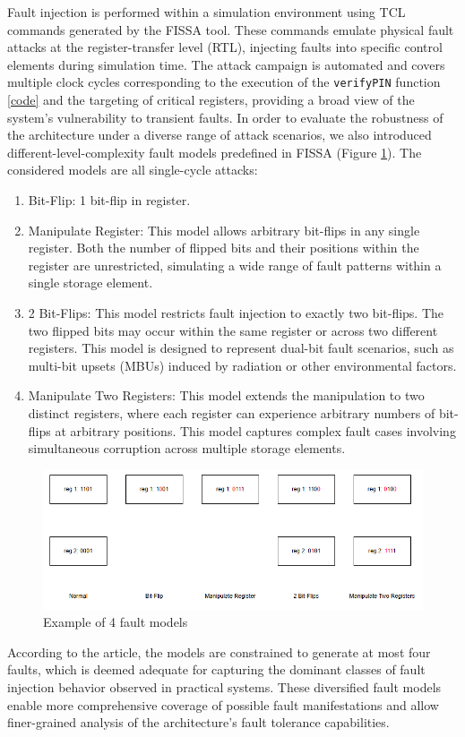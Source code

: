 Fault injection is performed within a simulation environment using TCL commands generated by the FISSA tool. These commands emulate physical fault attacks at the register-transfer level (RTL), injecting faults into specific control elements during simulation time. The attack campaign is automated and covers multiple clock cycles corresponding to the execution of the \texttt{verifyPIN} function \ref{code} and the targeting of critical registers, providing a broad view of the system’s vulnerability to transient faults. In order to evaluate the robustness of the architecture under a diverse range of attack scenarios, we also introduced different-level-complexity fault models predefined in FISSA (Figure \ref{fault model}). The considered models are all single-cycle attacks:
\begin{enumerate}
\item Bit-Flip: 1 bit-flip in register.
\item Manipulate Register: This model allows arbitrary bit-flips in any single register. Both the number of flipped bits and their positions within the register are unrestricted, simulating a wide range of fault patterns within a single storage element.
\item 2 Bit-Flips: This model restricts fault injection to exactly two bit-flips. The two flipped bits may occur within the same register or across two different registers. This model is designed to represent dual-bit fault scenarios, such as multi-bit upsets (MBUs) induced by radiation or other environmental factors.
\item Manipulate Two Registers: This model extends the manipulation to two distinct registers, where each register can experience arbitrary numbers of bit-flips at arbitrary positions. This model captures complex fault cases involving simultaneous corruption across multiple storage elements.
\end{enumerate}

\begin{figure}[t!]
  \centering
  \includegraphics[width=0.5\linewidth]{Chapitre2/figures/fault model.png}
  \caption{Example of 4 fault models}
  \label{fault model}
\end{figure}

According to the article\cite{sass2023oops}, the models are constrained to generate at most four faults, which is deemed adequate for capturing the dominant classes of fault injection behavior observed in practical systems. These diversified fault models enable more comprehensive coverage of possible fault manifestations and allow finer-grained analysis of the architecture’s fault tolerance capabilities.

